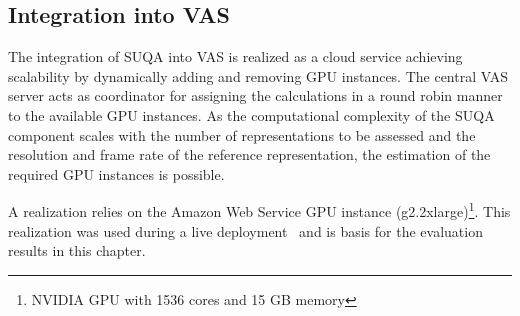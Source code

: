 \subsection{Integration into VAS}
 The integration of \ac{SUQA} into \ac{VAS} is realized as a cloud service achieving scalability by dynamically adding and removing \ac{GPU} instances.
 The central \ac{VAS} server acts as coordinator for assigning the calculations in a round robin manner to the available \ac{GPU} instances.
 As the computational complexity of the \ac{SUQA} component scales with the number of representations to be assessed and the resolution and frame rate of the reference representation, the estimation of the required \ac{GPU} instances is possible.
 
 A realization relies on the Amazon Web Service \ac{GPU} instance (g2.2xlarge)\footnote{NVIDIA GPU with 1536 cores and 15 GB memory}. 
 This realization was used during a live deployment~\cite{Wilk2016c} and is basis for the evaluation results in this chapter. 